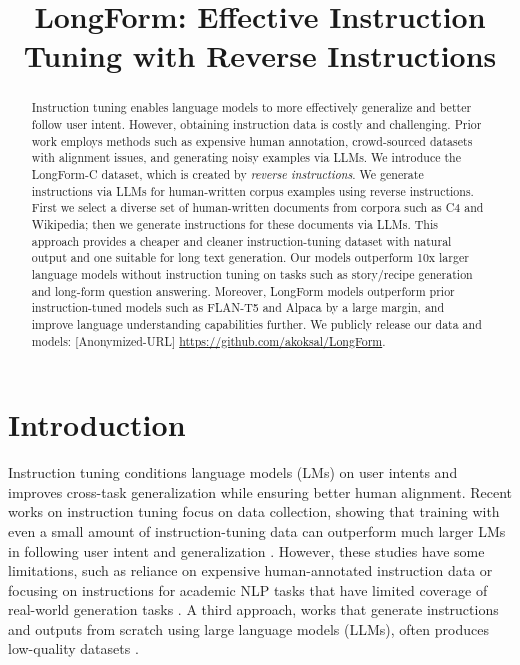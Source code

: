 \title{LongForm: Effective Instruction Tuning with Reverse Instructions}

\begin{abstract}
Instruction tuning enables language models to more effectively generalize and better follow user intent. However, obtaining instruction data is costly and challenging. Prior work employs methods such as expensive human annotation, crowd-sourced datasets with alignment issues, and generating noisy examples via LLMs. We introduce the LongForm-C dataset, which is created by \textit{reverse instructions}. We generate instructions via LLMs for human-written corpus examples using reverse instructions. First we select a diverse set of human-written documents from corpora such as C4 and Wikipedia; then we generate instructions for these documents via LLMs. This approach provides a cheaper and cleaner instruction-tuning dataset with natural output and one suitable for long text generation. Our models outperform 10x larger language models without instruction tuning on tasks such as story/recipe generation and long-form question answering. Moreover, LongForm models outperform prior instruction-tuned models such as FLAN-T5 and Alpaca by a large margin, and improve language understanding capabilities further. We publicly release our data and models: 
		{[Anonymized-URL]}
		{\url{https://github.com/akoksal/LongForm}}.
\end{abstract}

\section{Introduction}
	Instruction tuning conditions language models (LMs) on user intents and improves cross-task generalization while ensuring better human alignment. Recent works on instruction tuning focus on data collection, showing that training with even a small amount of instruction-tuning data can outperform much larger LMs in following user intent and generalization \cite{ouyang2022training,
        chung2022scaling}. However, these studies have some limitations, such as reliance on expensive human-annotated instruction data \cite{ouyang2022training} or focusing on instructions for academic NLP tasks that have limited coverage of real-world generation tasks \cite{chung2022scaling, wang-etal-2022-super, sanh2022multitask}. A third approach, works that generate instructions and outputs from scratch using large language models (LLMs), often produces low-quality datasets \cite{honovich2022unnatural, wang-etal-2022-super}.

